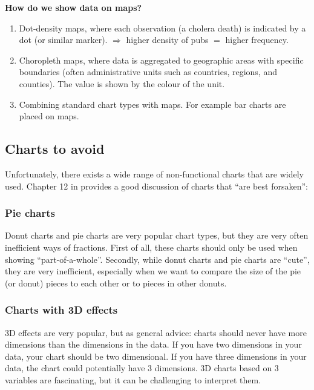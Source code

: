 \documentclass[
]{book}
\providecommand{\tightlist}{%
  \setlength{\itemsep}{0pt}\setlength{\parskip}{0pt}}
\begin{document}
\textbf{How do we show data on maps?}

\begin{enumerate}
\def\labelenumi{\arabic{enumi}.}
\setcounter{enumi}{2}
\tightlist
\item
  Dot-density maps, where each observation (a cholera death) is indicated by a dot (or similar marker). \(\Rightarrow\) higher density of pubs \(=\) higher frequency.
\item
  Choropleth maps, where data is aggregated to geographic areas with specific boundaries (often administrative units such as countries, regions, and counties). The value is shown by the colour of the unit.
\item
  Combining standard chart types with maps. For example bar charts are placed on maps.
\end{enumerate}

\hypertarget{charts-to-avoid}{%
\subsection*{Charts to avoid}\label{charts-to-avoid}}

Unfortunately, there exists a wide range of non-functional charts that are widely used. Chapter 12 in \citep{few2012show} provides a good discussion of charts that ``are best forsaken'':

\hypertarget{pie-charts}{%
\subsubsection*{Pie charts}\label{pie-charts}}

Donut charts and pie charts are very popular chart types, but they are very often inefficient ways of fractions. First of all, these charts should only be used when showing ``part-of-a-whole''. Secondly, while donut charts and pie charts are ``cute'', they are very inefficient, especially when we want to compare the size of the pie (or donut) pieces to each other or to pieces in other donuts.

\hypertarget{charts-with-3d-effects}{%
\subsubsection*{Charts with 3D effects}\label{charts-with-3d-effects}}

3D effects are very popular, but as general advice: charts should never have more dimensions than the dimensions in the data. If you have two dimensions in your data, your chart should be two dimensional. If you have three dimensions in your data, the chart could potentially have 3 dimensions. 3D charts based on 3 variables are fascinating, but it can be challenging to interpret them.
\end{document}
